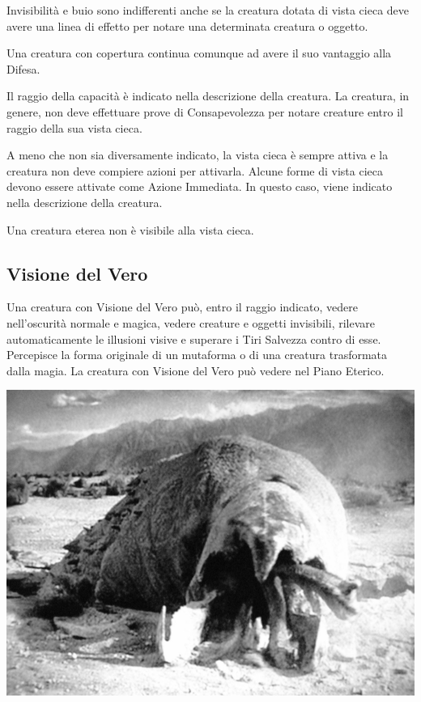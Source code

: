 \begin{multicols}{2}
Invisibilità e buio sono indifferenti anche se la creatura dotata di vista cieca deve avere una linea di effetto per notare una determinata creatura o oggetto.

Una creatura con copertura continua comunque ad avere il suo vantaggio alla Difesa.

Il raggio della capacità è indicato nella descrizione della creatura. La creatura, in genere, non deve effettuare prove di Consapevolezza per notare creature entro il raggio della sua vista cieca.

A meno che non sia diversamente indicato, la vista cieca è sempre attiva e la creatura non deve compiere azioni per attivarla. Alcune forme di vista cieca devono essere attivate come Azione Immediata. In questo caso, viene indicato nella descrizione della creatura.

Una creatura eterea non è visibile alla vista cieca.

\subsection{Visione del Vero}\label{Visione del Vero}\hypertarget{cap Visione del Vero}{}

Una creatura con Visione del Vero può, entro il raggio indicato, vedere nell'oscurità normale e magica, vedere creature e oggetti invisibili, rilevare automaticamente le illusioni visive e superare i Tiri Salvezza contro di esse. Percepisce la forma originale di un mutaforma o di una creatura trasformata dalla magia. La creatura con Visione del Vero può vedere nel Piano Eterico.

\medskip

\begin{center}
\includegraphics[height=0.65\linewidth]{immagini/grabroid.png}


\end{center}
\end{multicols}
